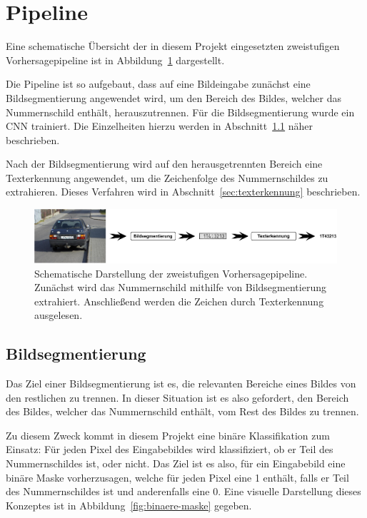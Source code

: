 \section{Pipeline}
\label{sec:pipeline}

Eine schematische \"Ubersicht der in diesem Projekt eingesetzten
zweistufigen Vorhersagepipeline ist in Abbildung~\ref{fig:pipeline}
dargestellt.

Die Pipeline ist so aufgebaut, dass auf eine Bildeingabe zun\"achst
eine Bildsegmentierung angewendet wird, um den Bereich des Bildes,
welcher das Nummernschild enth\"alt, herauszutrennen.
F\"ur die Bildsegmentierung wurde ein CNN trainiert.
Die Einzelheiten hierzu werden in Abschnitt~\ref{sec:bildsegmentierung}
n\"aher beschrieben.

Nach der Bildsegmentierung wird auf den herausgetrennten Bereich eine
Texterkennung angewendet, um die Zeichenfolge des Nummernschildes
zu extrahieren. Dieses Verfahren wird in Abschnitt~\ref{sec:texterkennung}
beschrieben.

\begin{figure}
    \centering
    \includegraphics[width=\textwidth]{abbildungen/pipeline}
    \caption[Pipeline]{Schematische Darstellung der zweistufigen Vorhersagepipeline.
        Zun\"achst wird das Nummernschild mithilfe von Bildsegmentierung
        extrahiert. Anschlie{\ss}end werden die Zeichen durch Texterkennung
        ausgelesen.}
    \label{fig:pipeline}
\end{figure}

\subsection{Bildsegmentierung}
\label{sec:bildsegmentierung}

Das Ziel einer Bildsegmentierung ist es, die relevanten Bereiche eines
Bildes von den restlichen zu trennen.
In dieser Situation ist es also gefordert, den Bereich des Bildes,
welcher das Nummernschild enth\"alt, vom Rest des Bildes zu trennen.

Zu diesem Zweck kommt in diesem Projekt eine bin\"are Klassifikation
zum Einsatz: F\"ur jeden Pixel des Eingabebildes wird klassifiziert,
ob er Teil des Nummernschildes ist, oder nicht.
Das Ziel ist es also, f\"ur ein Eingabebild eine bin\"are Maske vorherzusagen,
welche f\"ur jeden Pixel eine 1 enth\"alt, falls er Teil des Nummernschildes
ist und anderenfalls eine 0.
Eine visuelle Darstellung dieses Konzeptes ist in
Abbildung~\ref{fig:binaere-maske} gegeben.

